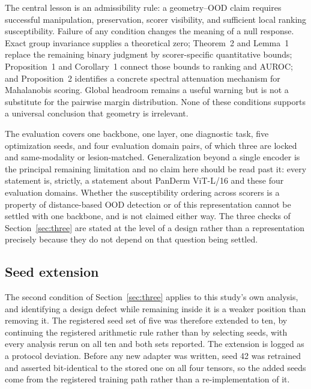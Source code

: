 \documentclass[11pt,a4paper]{article}
\begin{document}
The central lesson is an admissibility rule: a geometry--OOD claim requires successful manipulation, preservation, scorer visibility, and sufficient local ranking susceptibility. Failure of any condition changes the meaning of a null response. Exact group invariance supplies a theoretical zero; Theorem~2 and Lemma~1 replace the remaining binary judgment by scorer-specific quantitative bounds; Proposition~1 and Corollary~1 connect those bounds to ranking and AUROC; and Proposition~2 identifies a concrete spectral attenuation mechanism for Mahalanobis scoring. Global headroom remains a useful warning but is not a substitute for the pairwise margin distribution. None of these conditions supports a universal conclusion that geometry is irrelevant.

The evaluation covers one backbone, one layer, one diagnostic task, five optimization seeds, and four evaluation domain pairs, of which three are locked and same-modality or lesion-matched. Generalization beyond a single encoder is the principal remaining limitation
and no claim here should be read past it: every statement is, strictly, a
statement about PanDerm ViT-L/16 and these four evaluation domains. Whether the
susceptibility ordering across scorers is a property of distance-based OOD
detection or of this representation cannot be settled with one backbone, and is
not claimed either way. The three checks of Section~\ref{sec:three} are stated
at the level of a design rather than a representation precisely because they do
not depend on that question being settled.

\subsection{Seed extension}
\label{sec:seeds}
The second condition of Section~\ref{sec:three} applies to this study's own
analysis, and identifying a design defect while remaining inside it is a weaker
position than removing it. The registered seed set of five was therefore
extended to ten, by continuing the registered arithmetic rule rather than by
selecting seeds, with every analysis rerun on all ten and both sets reported.
The extension is logged as a protocol deviation. Before any new adapter was
written, seed 42 was retrained and asserted bit-identical to the stored one on
all four tensors, so the added seeds come from the registered training path
rather than a re-implementation of it.
\end{document}
